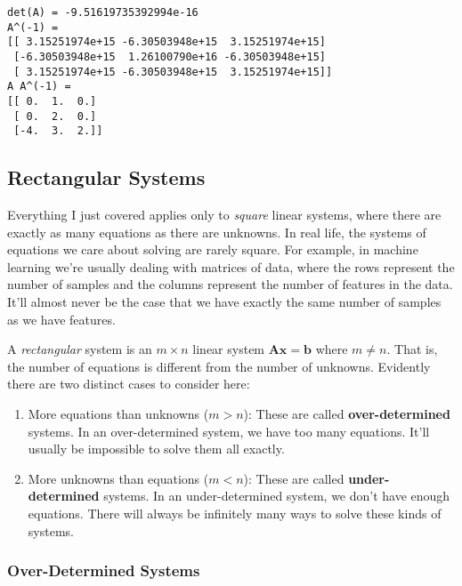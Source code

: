 \documentclass[
  letterpaper,
  DIV=11,
  numbers=noendperiod]{scrreprt}
\providecommand{\tightlist}{%
  \setlength{\itemsep}{0pt}\setlength{\parskip}{0pt}}\usepackage{longtable,booktabs,array}
\begin{document}
\begin{verbatim}
det(A) = -9.51619735392994e-16
A^(-1) = 
[[ 3.15251974e+15 -6.30503948e+15  3.15251974e+15]
 [-6.30503948e+15  1.26100790e+16 -6.30503948e+15]
 [ 3.15251974e+15 -6.30503948e+15  3.15251974e+15]]
A A^(-1) = 
[[ 0.  1.  0.]
 [ 0.  2.  0.]
 [-4.  3.  2.]]
\end{verbatim}

\hypertarget{rectangular-systems}{%
\subsection{Rectangular Systems}\label{rectangular-systems}}

Everything I just covered applies only to \emph{square} linear systems,
where there are exactly as many equations as there are unknowns. In real
life, the systems of equations we care about solving are rarely square.
For example, in machine learning we're usually dealing with matrices of
data, where the rows represent the number of samples and the columns
represent the number of features in the data. It'll almost never be the
case that we have exactly the same number of samples as we have
features.

A \emph{rectangular} system is an \(m \times n\) linear system
\(\mathbf{A}\mathbf{x} = \mathbf{b}\) where \(m \neq n\). That is, the
number of equations is different from the number of unknowns. Evidently
there are two distinct cases to consider here:

\begin{enumerate}
\def\labelenumi{\arabic{enumi}.}
\tightlist
\item
  More equations than unknowns (\(m > n\)): These are called
  \textbf{over-determined} systems. In an over-determined system, we
  have too many equations. It'll usually be impossible to solve them all
  exactly.
\item
  More unknowns than equations (\(m < n\)): These are called
  \textbf{under-determined} systems. In an under-determined system, we
  don't have enough equations. There will always be infinitely many ways
  to solve these kinds of systems.
\end{enumerate}

\hypertarget{over-determined-systems}{%
\subsubsection{Over-Determined Systems}\label{over-determined-systems}}
\end{document}
